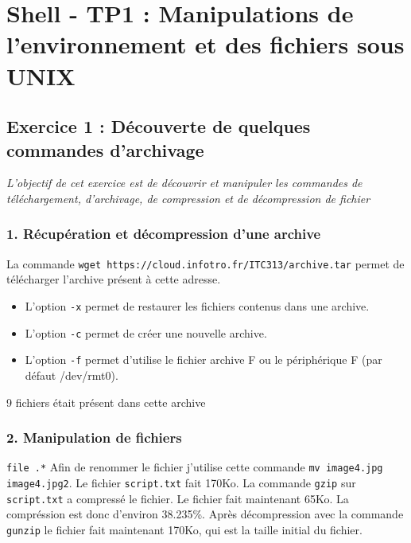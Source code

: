 \chapter{Shell - TP1 : Manipulations de l’environnement et des fichiers sous UNIX}
    \section{Exercice 1 : Découverte de quelques commandes d'archivage}
    \textit{L'objectif de cet exercice est de découvrir et manipuler les commandes de téléchargement, d'archivage, de compression et de décompression de fichier}
        \subsection{1. Récupération et décompression d'une archive}
            La commande \texttt{wget https://cloud.infotro.fr/ITC313/archive.tar} permet de télécharger l'archive présent à cette adresse.
            \begin{itemize}
                \item L'option \texttt{-x} permet de restaurer les fichiers contenus dans une archive.
                \item L'option \texttt{-c} permet de créer une nouvelle archive.
                \item L'option \texttt{-f} permet d'utilise le fichier archive F ou le périphérique F (par défaut /dev/rmt0).
            \end{itemize}
            9 fichiers était présent dans cette archive
        \subsection{2. Manipulation de fichiers}
            \texttt{file .\/*}
            Afin de renommer le fichier j'utilise cette commande \texttt{mv image4.jpg image4.jpg2}.
            Le fichier \texttt{script.txt} fait 170Ko.
            La commande \texttt{gzip} sur \texttt{script.txt} a compressé le fichier.
            Le fichier fait maintenant  65Ko.
            La compréssion est donc d'environ 38.235\%.
            Après décompression avec la commande \texttt{gunzip} le fichier fait maintenant 170Ko, qui est la taille initial du fichier.
